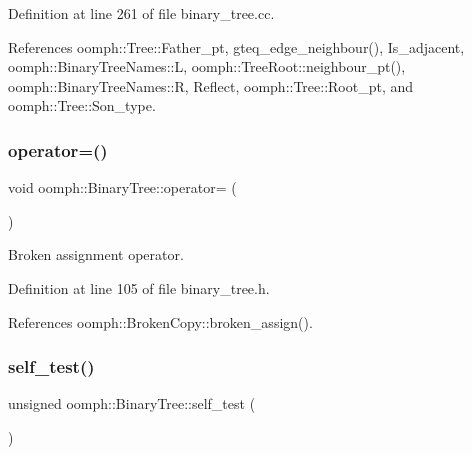 Definition at line 261 of file binary\+\_\+tree.\+cc.



References oomph\+::\+Tree\+::\+Father\+\_\+pt, gteq\+\_\+edge\+\_\+neighbour(), Is\+\_\+adjacent, oomph\+::\+Binary\+Tree\+Names\+::L, oomph\+::\+Tree\+Root\+::neighbour\+\_\+pt(), oomph\+::\+Binary\+Tree\+Names\+::R, Reflect, oomph\+::\+Tree\+::\+Root\+\_\+pt, and oomph\+::\+Tree\+::\+Son\+\_\+type.

\mbox{\label{classoomph_1_1BinaryTree_ad23440beb13ed9207c4489fb744a1d78}} 
\subsubsection{\texorpdfstring{operator=()}{operator=()}}
{\footnotesize\ttfamily void oomph\+::\+Binary\+Tree\+::operator= (\begin{DoxyParamCaption}\item[{const \hyperlink{classoomph_1_1BinaryTree}{Binary\+Tree} \&}]{ }\end{DoxyParamCaption})\hspace{0.3cm}{\ttfamily [inline]}}



Broken assignment operator. 



Definition at line 105 of file binary\+\_\+tree.\+h.



References oomph\+::\+Broken\+Copy\+::broken\+\_\+assign().

\mbox{\label{classoomph_1_1BinaryTree_ac8052fae786bd4aad0a7334d04b59328}} 
\subsubsection{\texorpdfstring{self\+\_\+test()}{self\_test()}}
{\footnotesize\ttfamily unsigned oomph\+::\+Binary\+Tree\+::self\+\_\+test (\begin{DoxyParamCaption}{ }\end{DoxyParamCaption})}



